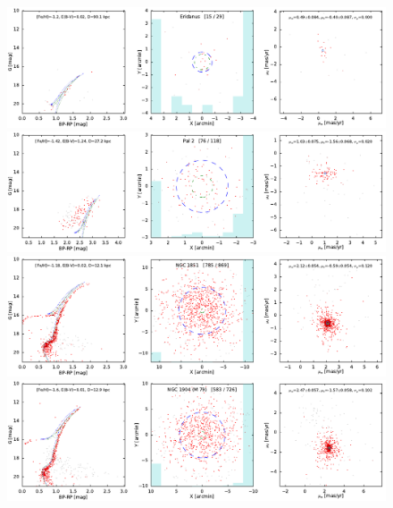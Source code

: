 \documentclass[usenatbib]{mnras}
\begin{document}
\clearpage\begin{figure}
\contcaption{}
\includegraphics{figs/Eridanus.pdf}
\includegraphics{figs/Pal_2.pdf}
\includegraphics{figs/NGC_1851.pdf}
\includegraphics{figs/NGC_1904_M_79.pdf}
\end{figure}
\end{document}
